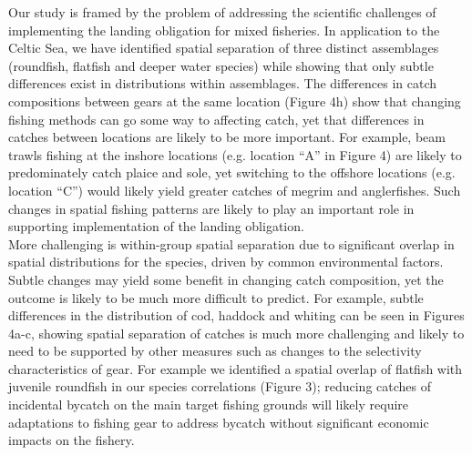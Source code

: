\documentclass[fleqn,10pt]{wlscirep}
\begin{document}
\begin{linenumbers}
Our study is framed by the problem of addressing the scientific challenges of
implementing the landing obligation for mixed fisheries. In application to the
Celtic Sea, we have identified spatial separation of three distinct assemblages
(roundfish, flatfish and deeper water species) while showing that only subtle
differences exist in distributions within assemblages. The differences in catch
compositions between gears at the same location (Figure 4h) show that changing
fishing methods can go some way to affecting catch, yet that differences in
catches between locations are likely to be more important. For example, beam
trawls fishing at the inshore locations (e.g. location ``A'' in Figure 4) are
likely to predominately catch plaice and sole, yet switching to the offshore
locations (e.g. location ``C'') would likely yield greater catches of megrim
and anglerfishes.  Such changes in spatial fishing patterns are likely to play
an important role in supporting implementation of the landing obligation.\\

More challenging is within-group spatial separation due to significant overlap
in spatial distributions for the species, driven by common environmental
factors. Subtle changes may yield some benefit in changing catch composition,
yet the outcome is likely to be much more difficult to predict. For example,
subtle differences in the distribution of cod, haddock and whiting can be seen
in Figures 4a-c, showing spatial separation of catches is much more challenging
and likely to need to be supported by other measures such as changes to the
selectivity characteristics of gear\cite{Santos2016}. For example we identified
a spatial overlap of flatfish with juvenile roundfish in our species
correlations (Figure 3); reducing catches of incidental bycatch on the main
target fishing grounds will likely require adaptations to fishing gear to
address bycatch without significant economic impacts on the fishery.\\


\end{linenumbers}
\end{document}
